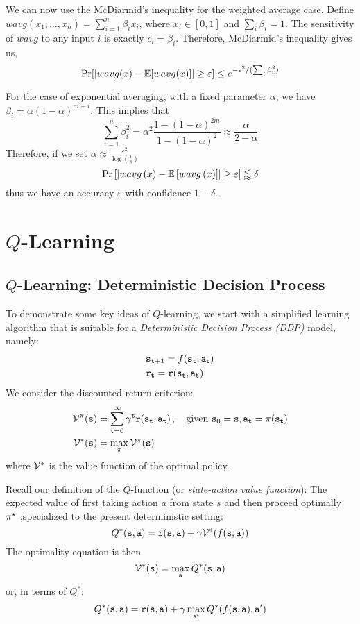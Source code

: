We can now use the McDiarmid's inequality for the weighted average
case. Define $wavg(x_1, \ldots , x_n)=\sum_{i=1}^n \beta_i x_i$,
where $x_i\in[0,1]$ and $\sum_i \beta_i=1$. The sensitivity of
$wavg$ to any input $i$ is exactly $c_i=\beta_i$.
Therefore, McDiarmid's inequality gives us,
\[
\Pr[|wavg(x)-\mathbb{E}[wavg(x)]|\geq \varepsilon]\leq
e^{-\varepsilon^2/(\sum_i \beta_i^2)}
\]

For the case of exponential averaging, with a fixed parameter $\alpha$, we have $\beta_i=\alpha(1-\alpha)^{m-i}$. This implies
that
\[
\sum_{i=1}^n \beta_i^2 =
\alpha^2\frac{1-(1-\alpha)^{2m}}{1-(1-\alpha)^2}\approx
\frac{\alpha}{2-\alpha}
\]
Therefore, if we set $\alpha\approx\frac{\varepsilon^{2}}{\log\left(\frac{1}{\delta}\right)}$
\[
\Pr\left[\left|wavg\left(x\right)-\mathbb{E}\left[wavg\left(x\right)\right]\right|\geq\varepsilon\right]\lessapprox\delta
\]
thus we have an accuracy $\varepsilon$ with confidence $1-\delta$.


\section{$Q$-Learning}
\subsection{ $Q$-Learning: Deterministic Decision Process}

To demonstrate some key ideas of $Q$-learning, we start with a
simplified learning algorithm that is suitable for a {\em
Deterministic Decision Process (DDP)} model, namely:
\begin{align*}
& {\tt s}_{{\tt t}+1}=f({\tt s}_{\tt t},{\tt a}_{\tt t}) \\
& {\tt r}_{\tt t}={\tt r}({\tt s}_{\tt t},{\tt a}_{\tt t})
\end{align*}
We consider the discounted return criterion:
\begin{align*}
\mathcal{V}^{\pi}({\tt s}) &=\sum_{{\tt t}=0}^\infty \gamma^{\tt t}
{\tt r}({\tt s}_{\tt t},{\tt a}_{\tt t})\,,
\quad \text{given } {\tt s}_0={\tt s}, {\tt a}_{\tt t}=\pi({\tt s}_{\tt t})\\
\mathcal{V}^*({\tt s}) &= \max_\pi \mathcal{V}^\pi({\tt s})
\end{align*}
where $\mathcal{V}^*$ is the value function of the optimal policy.

Recall our definition of the $Q$-function (or {\em state-action
value function}): The expected value of first taking
action $a$ from state $s$ and then proceed optimally $\pi^{\star}$ ,specialized to the present deterministic setting:
$$
Q^*({\tt s},{\tt a})={\tt r}({\tt s},{\tt a})+\gamma
\mathcal{V}^*(f({\tt s},{\tt a}))
$$
The optimality equation is then
$$
\mathcal{V}^*({\tt s}) = \max_{\tt a} Q^*({\tt s},{\tt a})
$$
or, in terms of $Q^*$:
$$
Q^*({\tt s},{\tt a})={\tt r}({\tt s},{\tt a})+\gamma
\max_{{\tt a}'}Q^*(f({\tt s},{\tt a}),{\tt a}')
$$

